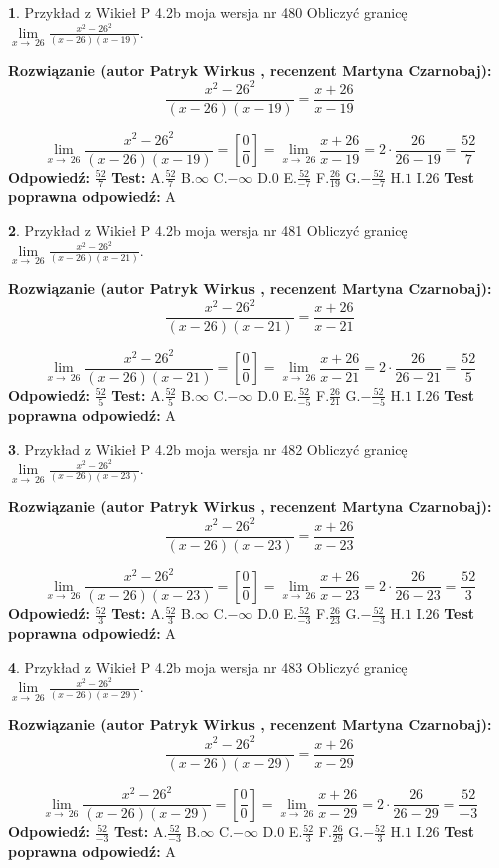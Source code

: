 \documentclass[12pt, a4paper]{article}
\theoremstyle{definition} %
\newtheorem{zad}{}
\newcommand{\zadStart}[1]{\begin{zad}#1\newline}
\newcommand{\zadStop}{\end{zad}}
\newcommand{\rozwStart}[2]{\noindent \textbf{Rozwiązanie (autor #1 , recenzent #2): }\newline}
\newcommand{\rozwStop}{\newline}
\newcommand{\odpStart}{\noindent \textbf{Odpowiedź:}\newline}
\newcommand{\odpStop}{\newline}
\newcommand{\testStart}{\noindent \textbf{Test:}\newline}
\newcommand{\testStop}{\newline}
\newcommand{\kluczStart}{\noindent \textbf{Test poprawna odpowiedź:}\newline}
\newcommand{\kluczStop}{\newline}
\begin{document}
\zadStart{Przykład z Wikieł P 4.2b moja wersja nr 480}
Obliczyć granicę $\lim\limits_{x\to\ 26}\frac{x^{2}-26^{2}}{(x-26)(x-19)}$.
\zadStop
\rozwStart{Patryk Wirkus}{Martyna Czarnobaj}
$$\frac{x^{2}-26^{2}}{(x-26)(x-19)}=\frac{x+26}{x-19}$$

$$\lim\limits_{x\to\ 26}\frac{x^{2}-26^{2}}{(x-26)(x-19)}=[\frac{0}{0}]=\lim\limits_{x\to\ 26}\frac{x+26}{x-19}=2 \cdot \frac{26}{26-19} = \frac{52}{7}$$
\rozwStop
\odpStart
$\frac{52}{7}$
\odpStop
\testStart
A.$\frac{52}{7}$
B.$\infty$
C.$-\infty$
D.$0$
E.$\frac{52}{-7}$
F.$\frac{26}{19}$
G.$-\frac{52}{-7}$
H.$1$
I.$26$
\testStop
\kluczStart
A
\kluczStop



\zadStart{Przykład z Wikieł P 4.2b moja wersja nr 481}
Obliczyć granicę $\lim\limits_{x\to\ 26}\frac{x^{2}-26^{2}}{(x-26)(x-21)}$.
\zadStop
\rozwStart{Patryk Wirkus}{Martyna Czarnobaj}
$$\frac{x^{2}-26^{2}}{(x-26)(x-21)}=\frac{x+26}{x-21}$$

$$\lim\limits_{x\to\ 26}\frac{x^{2}-26^{2}}{(x-26)(x-21)}=[\frac{0}{0}]=\lim\limits_{x\to\ 26}\frac{x+26}{x-21}=2 \cdot \frac{26}{26-21} = \frac{52}{5}$$
\rozwStop
\odpStart
$\frac{52}{5}$
\odpStop
\testStart
A.$\frac{52}{5}$
B.$\infty$
C.$-\infty$
D.$0$
E.$\frac{52}{-5}$
F.$\frac{26}{21}$
G.$-\frac{52}{-5}$
H.$1$
I.$26$
\testStop
\kluczStart
A
\kluczStop



\zadStart{Przykład z Wikieł P 4.2b moja wersja nr 482}
Obliczyć granicę $\lim\limits_{x\to\ 26}\frac{x^{2}-26^{2}}{(x-26)(x-23)}$.
\zadStop
\rozwStart{Patryk Wirkus}{Martyna Czarnobaj}
$$\frac{x^{2}-26^{2}}{(x-26)(x-23)}=\frac{x+26}{x-23}$$

$$\lim\limits_{x\to\ 26}\frac{x^{2}-26^{2}}{(x-26)(x-23)}=[\frac{0}{0}]=\lim\limits_{x\to\ 26}\frac{x+26}{x-23}=2 \cdot \frac{26}{26-23} = \frac{52}{3}$$
\rozwStop
\odpStart
$\frac{52}{3}$
\odpStop
\testStart
A.$\frac{52}{3}$
B.$\infty$
C.$-\infty$
D.$0$
E.$\frac{52}{-3}$
F.$\frac{26}{23}$
G.$-\frac{52}{-3}$
H.$1$
I.$26$
\testStop
\kluczStart
A
\kluczStop



\zadStart{Przykład z Wikieł P 4.2b moja wersja nr 483}
Obliczyć granicę $\lim\limits_{x\to\ 26}\frac{x^{2}-26^{2}}{(x-26)(x-29)}$.
\zadStop
\rozwStart{Patryk Wirkus}{Martyna Czarnobaj}
$$\frac{x^{2}-26^{2}}{(x-26)(x-29)}=\frac{x+26}{x-29}$$

$$\lim\limits_{x\to\ 26}\frac{x^{2}-26^{2}}{(x-26)(x-29)}=[\frac{0}{0}]=\lim\limits_{x\to\ 26}\frac{x+26}{x-29}=2 \cdot \frac{26}{26-29} = \frac{52}{-3}$$
\rozwStop
\odpStart
$\frac{52}{-3}$
\odpStop
\testStart
A.$\frac{52}{-3}$
B.$\infty$
C.$-\infty$
D.$0$
E.$\frac{52}{3}$
F.$\frac{26}{29}$
G.$-\frac{52}{3}$
H.$1$
I.$26$
\testStop
\kluczStart
A
\kluczStop
\end{document}
